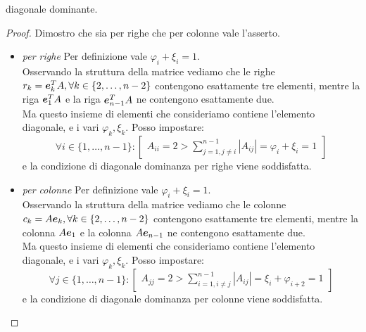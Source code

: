 diagonale dominante. \begin{proof} Dimostro che sia per righe che per colonne
vale l'asserto.
	\begin{itemize}
	  \item \emph{per righe} Per definizione vale $\varphi_{i} + \xi_{i} = 1$.\\ 
	  Osservando la struttura della matrice vediamo che le righe $r_{k} =
	  \boldsymbol{e}_{k}^{T}A, \forall k \in \{2, \ldots, n-2\}$ contengono esattamente
	  tre elementi, mentre la riga $\boldsymbol{e}_{1}^{T}A$ e la riga
	  $\boldsymbol{e}_{n-1}^{T}A$ ne contengono esattamente due. \\
	  Ma questo insieme di elementi che
	  consideriamo contiene l'elemento diagonale, e i vari $\varphi_{k},
	  \xi_{k}$. Posso impostare:
	  \begin{displaymath}
	  	\forall i \in \{ 1, \ldots, n-1\}:
	  	\begin{bmatrix} 
	  		A_{ii} = 2 > \sum_{j = 1, j \not = i}^{n-1}{|A_{ij}|} = \varphi_{i} + 
	  		\xi_{i} = 1
	  	\end{bmatrix}
	  \end{displaymath}
	  e la condizione di diagonale dominanza per righe viene soddisfatta.
	  \item \emph{per colonne} Per definizione vale $\varphi_{i} + \xi_{i} = 1$.\\ 
	  Osservando la struttura della matrice vediamo che le colonne $c_{k} =
	  A\boldsymbol{e}_{k}, \forall k \in \{2, \ldots, n-2\}$ contengono esattamente
	  tre elementi, mentre la colonna $A\boldsymbol{e}_{1}$ e la colonna
	  $A\boldsymbol{e}_{n-1}$ ne contengono esattamente due. \\
	  Ma questo insieme di elementi che
	  consideriamo contiene l'elemento diagonale, e i vari $\varphi_{k},
	  \xi_{k}$. Posso impostare:
	  \begin{displaymath}
	  	\forall j \in \{ 1, \ldots, n-1\}:
	  	\begin{bmatrix} 
	  		A_{jj} = 2 > \sum_{i = 1, i \not = j}^{n-1}{|A_{ij}|} = 
	  		\xi_{i} + \varphi_{i+2}= 1
	  	\end{bmatrix}
	  \end{displaymath}
	  e la condizione di diagonale dominanza per colonne viene soddisfatta.
	\end{itemize}
\end{proof}

